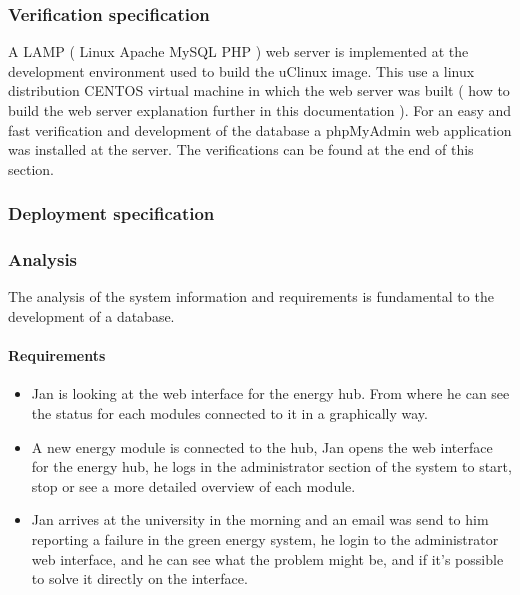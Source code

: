 \subsubsection{Verification specification}
A LAMP ( Linux Apache MySQL PHP ) web server is implemented at the development environment used to build the uClinux image. This use a linux distribution CENTOS virtual machine in which the web server was built ( how to build the web server explanation further in this documentation ).
For an easy and fast verification and development of the database a phpMyAdmin web application was installed at the server.
The verifications can be found at the end of this section.

\subsubsection{Deployment specification}

%	
\subsubsection{Analysis}
The analysis of the system information and requirements is fundamental to the development of a database. 
\paragraph{Requirements}
	\begin{itemize}
		\item Jan is looking at the web interface for the energy hub. From where he can see the status for each modules connected to it
in a graphically way.
		\item A new energy module is connected to the hub, Jan opens the web interface for the energy hub, he logs in the administrator section of the system
to start, stop or see a more detailed overview of each module.
		\item Jan arrives at the university in the morning and an email was send to him reporting a failure in the green energy system, he login to the administrator web interface, and he can see what the problem might be, and if it's possible to solve it directly on the interface.
	\end{itemize}

